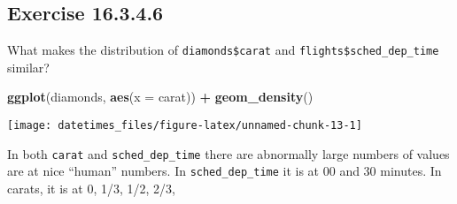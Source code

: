 \documentclass[]{book}
\newenvironment{Shaded}{\begin{snugshade}}{\end{snugshade}}
\newcommand{\CommentTok}[1]{\textcolor[rgb]{0.56,0.35,0.01}{\textit{#1}}}
\newcommand{\DataTypeTok}[1]{\textcolor[rgb]{0.13,0.29,0.53}{#1}}
\newcommand{\KeywordTok}[1]{\textcolor[rgb]{0.13,0.29,0.53}{\textbf{#1}}}
\newcommand{\NormalTok}[1]{#1}
\newcommand{\OperatorTok}[1]{\textcolor[rgb]{0.81,0.36,0.00}{\textbf{#1}}}
\newcommand{\OtherTok}[1]{\textcolor[rgb]{0.56,0.35,0.01}{#1}}
\newcommand{\StringTok}[1]{\textcolor[rgb]{0.31,0.60,0.02}{#1}}
\theoremstyle{plain}
\theoremstyle{remark}
\begin{document}
\begin{Shaded}
\end{Shaded}

\hypertarget{exercise-16.3.4.6}{%
\subsection*{\texorpdfstring{Exercise
{16.3.4.6}}{Exercise 16.3.4.6}}\label{exercise-16.3.4.6}}

What makes the distribution of \texttt{diamonds\$carat} and
\texttt{flights\$sched\_dep\_time} similar?

\begin{Shaded}
\begin{Highlighting}[]
\KeywordTok{ggplot}\NormalTok{(diamonds, }\KeywordTok{aes}\NormalTok{(}\DataTypeTok{x =}\NormalTok{ carat)) }\OperatorTok{+}
\StringTok{  }\KeywordTok{geom_density}\NormalTok{()}
\end{Highlighting}
\end{Shaded}

\begin{center}\texttt{[image: datetimes\_files/figure-latex/unnamed-chunk-13-1]} \end{center}

In both \texttt{carat} and \texttt{sched\_dep\_time} there are
abnormally large numbers of values are at nice ``human'' numbers. In
\texttt{sched\_dep\_time} it is at 00 and 30 minutes. In carats, it is
at 0, 1/3, 1/2, 2/3,
\end{document}

